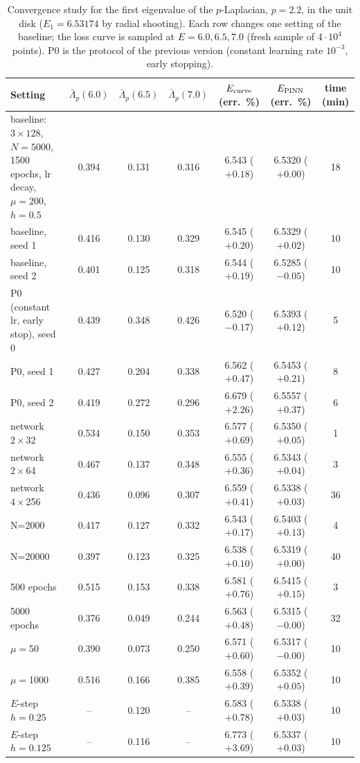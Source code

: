 \begin{table}[ht]
\centering
\begin{tabular}{lcccccc}
\toprule
Setting & $\bar\Lambda_p(6.0)$ & $\bar\Lambda_p(6.5)$ & $\bar\Lambda_p(7.0)$ & $E_{\rm curve}$ (err.\ \%) & $E_{\rm PINN}$ (err.\ \%) & time (min) \\
\midrule
baseline: $3\times128$, $N=5000$, 1500 epochs, lr decay, $\mu=200$, $h=0.5$ & 0.394 & 0.131 & 0.316 & 6.543 ($+0.18$) & 6.5320 ($+0.00$) & 18 \\
baseline, seed 1 & 0.416 & 0.130 & 0.329 & 6.545 ($+0.20$) & 6.5329 ($+0.02$) & 10 \\
baseline, seed 2 & 0.401 & 0.125 & 0.318 & 6.544 ($+0.19$) & 6.5285 ($-0.05$) & 10 \\
P0 (constant lr, early stop), seed 0 & 0.439 & 0.348 & 0.426 & 6.520 ($-0.17$) & 6.5393 ($+0.12$) & 5 \\
P0, seed 1 & 0.427 & 0.204 & 0.338 & 6.562 ($+0.47$) & 6.5453 ($+0.21$) & 8 \\
P0, seed 2 & 0.419 & 0.272 & 0.296 & 6.679 ($+2.26$) & 6.5557 ($+0.37$) & 6 \\
network $2\times$32 & 0.534 & 0.150 & 0.353 & 6.577 ($+0.69$) & 6.5350 ($+0.05$) & 1 \\
network $2\times$64 & 0.467 & 0.137 & 0.348 & 6.555 ($+0.36$) & 6.5343 ($+0.04$) & 3 \\
network $4\times$256 & 0.436 & 0.096 & 0.307 & 6.559 ($+0.41$) & 6.5338 ($+0.03$) & 36 \\
N=2000 & 0.417 & 0.127 & 0.332 & 6.543 ($+0.17$) & 6.5403 ($+0.13$) & 4 \\
N=20000 & 0.397 & 0.123 & 0.325 & 6.538 ($+0.10$) & 6.5319 ($+0.00$) & 40 \\
500 epochs & 0.515 & 0.153 & 0.338 & 6.581 ($+0.76$) & 6.5415 ($+0.15$) & 3 \\
5000 epochs & 0.376 & 0.049 & 0.244 & 6.563 ($+0.48$) & 6.5315 ($-0.00$) & 32 \\
$\mu=$50 & 0.390 & 0.073 & 0.250 & 6.571 ($+0.60$) & 6.5317 ($-0.00$) & 10 \\
$\mu=$1000 & 0.516 & 0.166 & 0.385 & 6.558 ($+0.39$) & 6.5352 ($+0.05$) & 10 \\
$E$-step $h=0.25$ & -- & 0.120 & -- & 6.583 ($+0.78$) & 6.5338 ($+0.03$) & 10 \\
$E$-step $h=0.125$ & -- & 0.116 & -- & 6.773 ($+3.69$) & 6.5337 ($+0.03$) & 10 \\
\bottomrule
\end{tabular}
\caption{Convergence study for the first eigenvalue of the $p$-Laplacian, $p=2.2$, in the unit disk ($E_1=6.53174$ by radial shooting). Each row changes one setting of the baseline; the loss curve is sampled at $E=6.0,6.5,7.0$ (fresh sample of $4\cdot10^4$ points). P0 is the protocol of the previous version (constant learning rate $10^{-3}$, early stopping).}
\label{tab.plap.conv}
\end{table}

